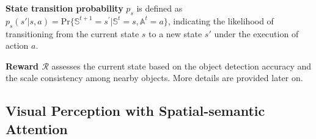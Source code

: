 \documentclass[letterpaper]{article} %
\newcommand\rjf[1]{\textcolor{red}{\{RJF: #1\}}}
\newcommand\zjl[1]{\textcolor{blue}{\{ZJL: #1\}}}
\newcommand\yxy[1]{\textcolor{blue}{\{YXY: #1\}}}
\begin{document}
\noindent\textbf{State transition probability} $p_s$ is defined as $p_s(s'|s, a)= \text{Pr}\{{\mathbb{S}^{t+1}=s^\prime| \mathbb{S}^{t}=s, \mathbb{A}^{t}=a}\}$, indicating the likelihood of transitioning from the current state $s$ to a new state $s'$ under the execution of action $a$. %


\noindent\textbf{Reward $\mathcal{R}$} assesses the current state based on the object detection accuracy and the scale consistency among nearby objects. More details are provided later on.




\subsection{Visual Perception with Spatial-semantic Attention}
\label{sssec:att}
\end{document}
